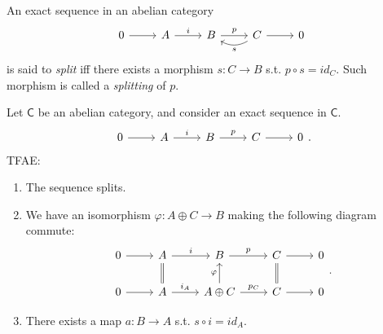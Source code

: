 \documentclass[../Main]{subfiles}
\begin{document}
\begin{defn}
	An exact sequence in an abelian category
	\begin{equation}
	\begin{tikzcd}
		0 \arrow[r, "", rightarrow] &
		A \arrow[r, "i", rightarrow] &
		B \arrow[r, "p", rightarrow] &
		C \arrow[r, "", rightarrow] \arrow[l, "s", bend left, rightarrow] &
		0
	\end{tikzcd}
	\end{equation} 
	is said to {\em split} iff there exists a morphism $s\colon C \to B$
	s.t. $p \circ s = id_C$.
	Such morphism is called a {\em splitting} of $p$.
\end{defn}

\begin{lem}
	Let $\mathsf{C}$ be an abelian category, and consider an exact sequence in $\mathsf{C}$.
	\begin{equation}
	\begin{tikzcd}
		0 \arrow[r, "", rightarrow] &
		A \arrow[r, "i", rightarrow] &
		B \arrow[r, "p", rightarrow] &
		C \arrow[r, "", rightarrow] &
		0
	\end{tikzcd}
	.\end{equation} 
	TFAE:
	\begin{enumerate}
		\item The sequence splits.
		\item We have an isomorphism $\varphi\colon A \oplus C \to B$
			making the following diagram commute:
	\begin{equation}
	\begin{tikzcd}
		0 \arrow[r, "", rightarrow] &
		A \arrow[r, "i", rightarrow] \arrow[d, "", equals] &
		B \arrow[r, "p", rightarrow] &
		C \arrow[r, "", rightarrow] \arrow[d, "", equals] &
		0 \\
		0 \arrow[r, "", rightarrow] &
		A \arrow[r, "i_A", rightarrow] &
		A \oplus C \arrow[r, "p_C", rightarrow] \arrow[u, "\varphi", rightarrow] &
		C \arrow[r, "", rightarrow] &
		0 
	\end{tikzcd}
	.\end{equation} 

		\item There exists a map $a\colon B \to A$ s.t. $s \circ i = id_A$.
	\end{enumerate}
\end{lem} 
\end{document}

